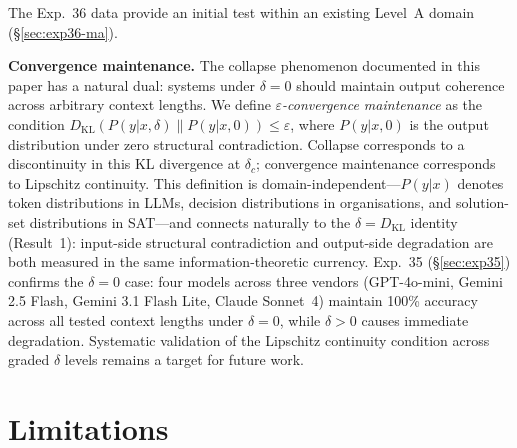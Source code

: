 \documentclass[11pt,a4paper]{article}
\begin{document}
The Exp.~36 data provide an initial test within an existing Level~A domain (\S\ref{sec:exp36-ma}).

\textbf{Convergence maintenance.} The collapse phenomenon documented in this paper has a natural dual: systems under $\delta = 0$ should maintain output coherence across arbitrary context lengths. We define \emph{$\varepsilon$-convergence maintenance} as the condition $D_{\text{KL}}(P(y|x, \delta) \| P(y|x, 0)) \leq \varepsilon$, where $P(y|x, 0)$ is the output distribution under zero structural contradiction. Collapse corresponds to a discontinuity in this KL divergence at $\delta_c$; convergence maintenance corresponds to Lipschitz continuity. This definition is domain-independent---$P(y|x)$ denotes token distributions in LLMs, decision distributions in organisations, and solution-set distributions in SAT---and connects naturally to the $\delta = D_{\text{KL}}$ identity (Result~1): input-side structural contradiction and output-side degradation are both measured in the same information-theoretic currency. Exp.~35 (\S\ref{sec:exp35}) confirms the $\delta = 0$ case: four models across three vendors (GPT-4o-mini, Gemini 2.5 Flash, Gemini 3.1 Flash Lite, Claude Sonnet~4) maintain 100\% accuracy across all tested context lengths under $\delta = 0$, while $\delta > 0$ causes immediate degradation. Systematic validation of the Lipschitz continuity condition across graded $\delta$ levels remains a target for future work.

\section{Limitations}
\label{sec:limitations}
\end{document}
